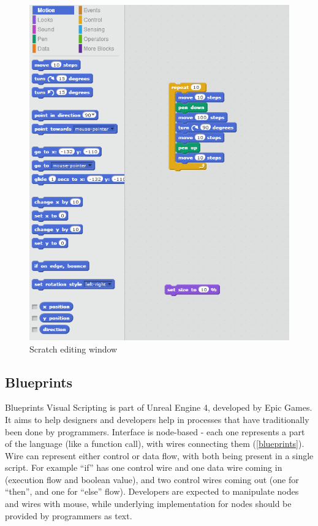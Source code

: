 \documentclass[11pt]{scrartcl}
\begin{document}
\begin{figure}[hbt]
  \includegraphics[scale=0.3]{img/s-puzzle}
  \caption{Scratch editing window}
  \label{scratch}
\end{figure}


\subsection{Blueprints}
Blueprints Visual Scripting is part of Unreal Engine 4, developed by Epic Games. It aims to help designers and developers help in processes that have traditionally been done by programmers. Interface is node-based - each one represents a part of the language (like a function call), with wires connecting them (\ref{blueprints}). Wire can represent either control or data flow, with both being present in a single script. For example “if” has one control wire and one data wire coming in (execution flow and boolean value), and two control wires coming out (one for “then”, and one for “else” flow). Developers are expected to manipulate nodes and wires with mouse, while underlying implementation for nodes should be provided by programmers as text.
\end{document}
